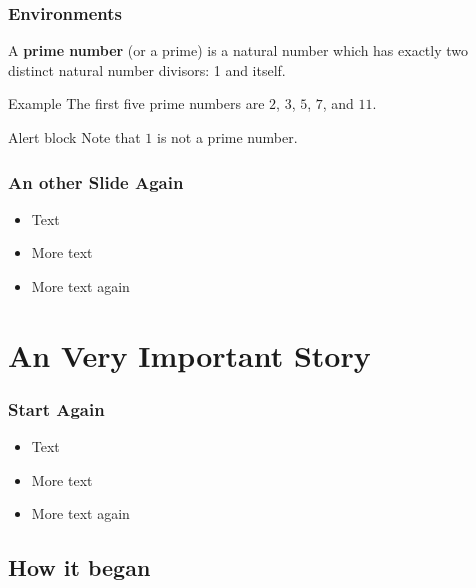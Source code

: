 \documentclass{beamer}
\begin{document}

\begin{frame}
\frametitle{Environments}
  \begin{definition}
    A \textbf{prime number} (or a prime) is a natural number which has exactly two distinct natural number divisors: 1 and itself. 
  \end{definition}

  \begin{exampleblock}{Example}
    The first five prime numbers are $2$, $3$, $5$, $7$, and $11$.
  \end{exampleblock}

  \begin{alertblock}{Alert block}
    Note that $1$ is not a prime number.
  \end{alertblock}
\end{frame}


\begin{frame} 
\frametitle{An other Slide Again}
  \begin{itemize}
  \item Text
  \item More text
  \item More text again
  \end{itemize}
\end{frame}

\section{An Very Important Story}

\begin{frame} 
\frametitle{Start Again}
  \begin{itemize}
  \item Text
  \item More text
  \item More text again
  \end{itemize}
\end{frame}

\subsection{How it began}
\end{document}
